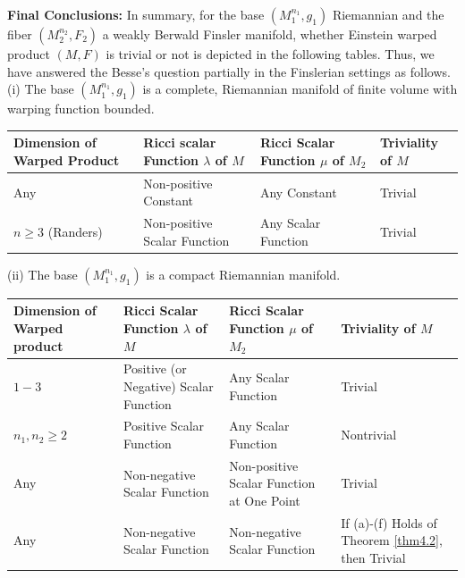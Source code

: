 \documentclass[pdflatex,sn-mathphys-num]{sn-jnl}%
\theoremstyle{thmstyleone}%
\theoremstyle{thmstyletwo}%
\theoremstyle{thmstylethree}%
\begin{document}
\vspace{0.15in}

\noindent
{\bf \large Final Conclusions:} 
In summary, for the base $(M_1^{n_1},g_1)$  Riemannian and the fiber $(M_2^{n_2},F_2)$ a weakly Berwald Finsler manifold, 
 whether Einstein warped product $(M,F)$ is trivial or not
is depicted in the following tables.
Thus,
we have answered the Besse's question  partially in the Finslerian settings as follows. \\

(i) The base $(M_1^{n_1},g_1)$
is a complete, Riemannian manifold
of finite volume with warping function bounded.\\

\begin{tabular}{ |p{3.5cm}|p{3.5cm}|p{3.5cm}|p{3.5cm}|  }
 \hline
 Dimension of Warped Product&  Ricci scalar Function $\lambda$ of $M$ &  Ricci Scalar Function $\mu$ of $M_2$ & Triviality of $M$\\
 \hline
 Any & Non-positive Constant & Any Constant& Trivial\\
 \hline
 $n\geq 3$ (Randers)& Non-positive Scalar Function & Any Scalar Function & Trivial\\
 \hline
\end{tabular}

\vspace{0.15in}

 (ii) The base $(M_1^{n_1},g_1)$
is a compact Riemannian manifold.\\



\begin{tabular}{ |p{3.5cm}|p{3.5cm}|p{3.5cm}|p{3.5cm}|  }
 \hline
 Dimension of Warped product& Ricci Scalar Function $\lambda$ of $M$ & Ricci Scalar Function $\mu$ of $M_2$ & Triviality of $M$\\
 \hline
 \hline
 $1-3$   & Positive (or Negative) Scalar Function    &Any Scalar Function&   Trivial\\
 \hline
 $n_1,n_2\geq 2$& Positive Scalar Function & Any Scalar Function & Nontrivial\\
 \hline
 Any&   Non-negative Scalar Function  & Non-positive Scalar Function at One Point   &Trivial\\
\hline
 Any &Non-negative Scalar Function & Non-negative Scalar Function&  If (a)-(f) Holds of Theorem \ref{thm4.2}, then Trivial\\
 
 \hline
\end{tabular}
\end{document}
